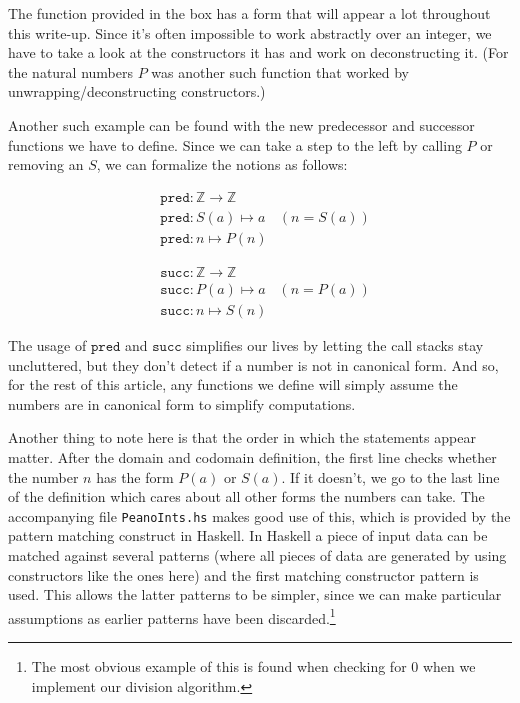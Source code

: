 \documentclass{article}
\newcommand{\Z}{\mathbb{Z}}
\begin{document}
The function provided in the box has a form that will appear a lot throughout this write-up. Since it's often impossible to work abstractly over an integer, we have to take a look at the constructors it has and work on deconstructing it. (For the natural numbers $P$ was another such function that worked by unwrapping/deconstructing constructors.)

Another such example can be found with the new predecessor and successor functions we have to define. Since we can take a step to the left by calling $P$ or removing an $S$, we can formalize the notions as follows:
\begin{multicols}{2}
\begin{align*}
&{} \mathtt{pred} : \Z \to \Z \\
&{} \mathtt{pred} : S(a) \mapsto a & (n = S(a))\\
&{} \mathtt{pred} : n \mapsto P(n)
\end{align*}

\begin{align*}
&{} \mathtt{succ} : \Z \to \Z \\
&{} \mathtt{succ} : P(a) \mapsto a & (n = P(a))\\
&{} \mathtt{succ} : n \mapsto S(n)
\end{align*}
\end{multicols}
The usage of $\mathtt{pred}$ and $\mathtt{succ}$ simplifies our lives by letting the call stacks stay uncluttered, but they don't detect if a number is not in canonical form. And so, for the rest of this article, any functions we define will simply assume the numbers are in canonical form to simplify computations.

Another thing to note here is that the order in which the statements appear matter. After the domain and codomain definition, the first line checks whether the number $n$ has the form $P(a)$ or $S(a)$. If it doesn't, we go to the last line of the definition which cares about all other forms the numbers can take. The accompanying file \texttt{PeanoInts.hs} makes good use of this, which is provided by the pattern matching construct in Haskell. In Haskell a piece of input data can be matched against several patterns (where all pieces of data are generated by using constructors like the ones here) and the first matching constructor pattern is used. This allows the latter patterns to be simpler, since we can make particular assumptions as earlier patterns have been discarded.\footnote{The most obvious example of this is found when checking for 0 when we implement our division algorithm.}
\end{document}
